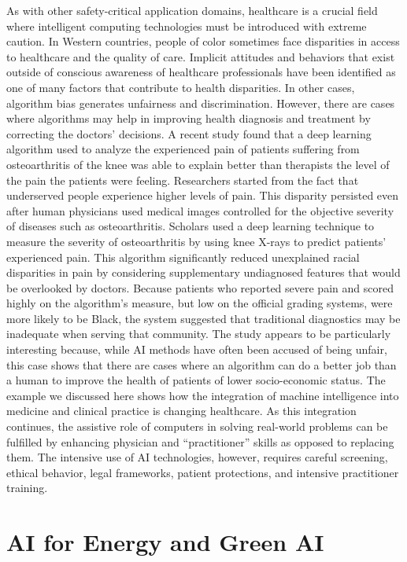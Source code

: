 As with other safety-critical application domains, healthcare is a crucial field where intelligent computing technologies must be introduced with extreme caution. In Western countries, people of color sometimes face disparities in access to healthcare and the quality of care. Implicit attitudes and behaviors that exist outside of conscious awareness of healthcare professionals have been identified as one of many factors that contribute to health disparities. In other cases, algorithm bias generates unfairness and discrimination. However, there are cases where algorithms may help in improving health diagnosis and treatment by correcting the doctors' decisions. A recent study found that a deep learning algorithm used to analyze the experienced pain of patients suffering from osteoarthritis of the knee was able to explain better than therapists the level of the pain the patients were feeling. Researchers started from the fact that underserved people experience higher levels of pain. This disparity persisted even after human physicians used medical images controlled for the objective severity of diseases such as osteoarthritis. Scholars used a deep learning technique to measure the severity of osteoarthritis by using knee X-rays to predict patients' experienced pain. This algorithm significantly reduced unexplained racial disparities in pain by considering supplementary undiagnosed features that would be overlooked by doctors. Because patients who reported severe pain and scored highly on the algorithm's measure, but low on the official grading systems, were more likely to be Black, the system suggested that traditional diagnostics may be inadequate when serving that community. The study appears to be particularly interesting because, while AI methods have often been accused of being unfair, this case shows that there are cases where an algorithm can do a better job than a human to improve the health of patients of lower socio-economic status. The example we discussed here shows how the integration of machine intelligence into medicine and clinical practice is changing healthcare. As this integration continues, the assistive role of computers in solving real-world problems can be fulfilled by enhancing physician and ``practitioner'' skills as opposed to replacing them. The intensive use of AI technologies, however, requires careful screening, ethical behavior, legal frameworks, patient protections, and intensive practitioner training.

\section{\label{sec:6.6}AI for Energy and Green AI}

